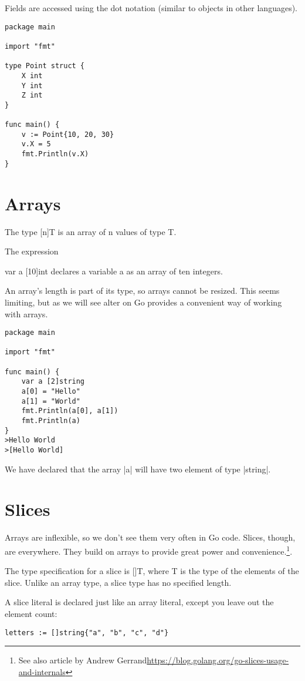 Fields are accessed using the dot notation (similar to objects in other languages).

\begin{lstlisting}
package main

import "fmt"

type Point struct {
	X int
	Y int
	Z int
}

func main() {
	v := Point{10, 20, 30}
	v.X = 5
	fmt.Println(v.X)
}
\end{lstlisting}

\section{Arrays}

The type [n]T is an array of n values of type T.

The expression

var a [10]int
declares a variable a as an array of ten integers.

An array's length is part of its type, so arrays cannot be resized. This seems limiting, but as we will see alter on Go provides a convenient way of working with arrays.

\begin{lstlisting}
package main

import "fmt"

func main() {
	var a [2]string
	a[0] = "Hello"
	a[1] = "World"
	fmt.Println(a[0], a[1])
	fmt.Println(a)
}
>Hello World
>[Hello World]
\end{lstlisting}

We have declared that the array |a| will have two element of type |string|.


\section{Slices}

Arrays are inflexible, so we don't see them very often in Go code. Slices, though, are everywhere. They build on arrays to provide great power and convenience.\footnote{See also article by Andrew Gerrand\protect\url{https://blog.golang.org/go-slices-usage-and-internals}}.

The type specification for a slice is []T, where T is the type of the elements of the slice. Unlike an array type, a slice type has no specified length.

A slice literal is declared just like an array literal, except you leave out the element count:

\begin{lstlisting}
letters := []string{"a", "b", "c", "d"}
\end{lstlisting}







